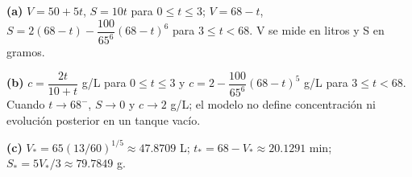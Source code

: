 \noindent\textbf{(a)} $V=50+5t$, $S=10t$ para $0\le t\le3$; $V=68-t$, $S=2(68-t)-\dfrac{100}{65^6}(68-t)^6$ para $3\le t<68$. V se mide en litros y S en gramos.

\noindent\textbf{(b)} $c=\dfrac{2t}{10+t}$ g/L para $0\le t\le3$ y $c=2-\dfrac{100}{65^6}(68-t)^5$ g/L para $3\le t<68$. Cuando $t\to68^-$, $S\to0$ y $c\to2$ g/L; el modelo no define concentración ni evolución posterior en un tanque vacío.

\noindent\textbf{(c)} $V_*=65(13/60)^{1/5}\approx47.8709$ L; $t_*=68-V_*\approx20.1291$ min; $S_*=5V_*/3\approx79.7849$ g.
